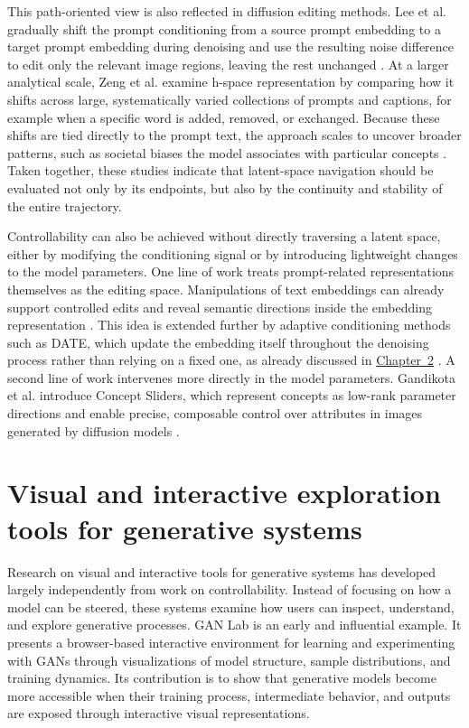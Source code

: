 This path-oriented view is also reflected in diffusion editing methods. Lee et al. gradually shift the prompt conditioning from a source prompt embedding to a target prompt embedding during denoising and use the resulting noise difference to edit only the relevant image regions, leaving the rest unchanged \cite{lee2024promptinterp}. At a larger analytical scale, Zeng et al. examine h-space representation by comparing how it shifts across large, systematically varied collections of prompts and captions, for example when a specific word is added, removed, or exchanged. Because these shifts are tied directly to the prompt text, the approach scales to uncover broader patterns, such as societal biases the model associates with particular concepts \cite{zeng2024decoding}. Taken together, these studies indicate that latent-space navigation should be evaluated not only by its endpoints, but also by the continuity and stability of the entire trajectory.

Controllability can also be achieved without directly traversing a latent space, either by modifying the conditioning signal or by introducing lightweight changes to the model parameters. One line of work treats prompt-related representations themselves as the editing space. Manipulations of text embeddings can already support controlled edits and reveal semantic directions inside the embedding representation \cite{yu2024textembedding}. This idea is extended further by adaptive conditioning methods such as DATE, which update the embedding itself throughout the denoising process rather than relying on a fixed one, as already discussed in \hyperref[ch:foundations]{Chapter~2} \cite{na2025date}. A second line of work intervenes more directly in the model parameters. Gandikota et al. introduce Concept Sliders, which represent concepts as low-rank parameter directions and enable precise, composable control over attributes in images generated by diffusion models \cite{gandikota2023conceptsliders}.

\section{Visual and interactive exploration tools for generative systems}\label{sec:3.2}

Research on visual and interactive tools for generative systems has developed largely independently from work on controllability. Instead of focusing on how a model can be steered, these systems examine how users can inspect, understand, and explore generative processes. GAN Lab is an early and influential example. It presents a browser-based interactive environment for learning and experimenting with GANs through visualizations of model structure, sample distributions, and training dynamics. Its contribution is to show that generative models become more accessible when their training process, intermediate behavior, and outputs are exposed through interactive visual representations. \cite{kahng2019ganlab}

